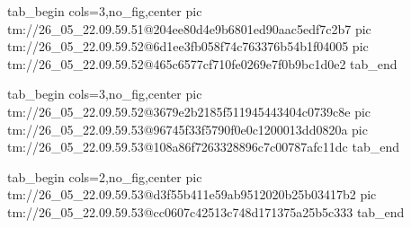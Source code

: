  
 
 
 
 

\qqSecCmtScr


\ifcmt
  tab_begin cols=3,no_fig,center
    pic tm://26_05_22.09.59.51@204ee80d4e9b6801ed90aac5edf7c2b7
    pic tm://26_05_22.09.59.52@6d1ee3fb058f74c763376b54b1f04005
    pic tm://26_05_22.09.59.52@465c6577cf710fe0269e7f0b9bc1d0e2
  tab_end
\fi


\ifcmt
  tab_begin cols=3,no_fig,center
    pic tm://26_05_22.09.59.52@3679e2b2185f511945443404c0739c8e
    pic tm://26_05_22.09.59.53@96745f33f5790f0e0c1200013dd0820a
    pic tm://26_05_22.09.59.53@108a86f7263328896c7c00787afc11dc
  tab_end
\fi


\ifcmt
  tab_begin cols=2,no_fig,center
    pic tm://26_05_22.09.59.53@d3f55b411e59ab9512020b25b03417b2
    pic tm://26_05_22.09.59.53@cc0607c42513c748d171375a25b5c333
  tab_end
\fi

